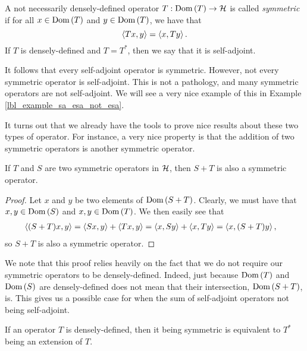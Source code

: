 \begin{definition}
  A not necessarily densely-defined operator $T: \operatorname{Dom}\left(T\right) \to \mathcal{H}$ is called {\emph{symmetric}} if for all $x \in \operatorname{Dom}\left(T\right)$ and $y \in \operatorname{Dom}\left(T\right)$, we have that
  \begin{equation*}
    \left\langle Tx, y\right\rangle = \left\langle x, Ty\right\rangle.
  \end{equation*}
  If $T$ is densely-defined and $T = T^*$, then we say that it is self-adjoint.
\end{definition}

It follows that every self-adjoint operator is symmetric. However, not every symmetric operator is self-adjoint. This is not a pathology, and many symmetric operators are not self-adjoint. We will see a very nice example of this in Example \eqref{lbl_example_sa_esa_not_esa}.

\medskip

It turns out that we already have the tools to prove nice results about these two types of operator. For instance, a very nice property is that the addition of two symmetric operators is another symmetric operator.

\begin{proposition}
  If $T$ and $S$ are two symmetric operators in $\mathcal{H}$, then $S+T$ is also a symmetric operator.
\end{proposition}
\begin{proof}
  Let $x$ and $y$ be two elements of $\operatorname{Dom}\left(S+T\right)$. Clearly, we must have that $x, y \in \operatorname{Dom}\left(S\right)$ and $x, y \in \operatorname{Dom}\left(T\right)$. We then easily see that
  \begin{align*}
    \left\langle (S + T)x, y\right\rangle
    &=
    \left\langle Sx, y\right\rangle + \left\langle Tx, y\right\rangle
    =
    \left\langle x, Sy\right\rangle + \left\langle x, Ty\right\rangle
    =
    \left\langle x, (S + T)y\right\rangle,
  \end{align*}
  so $S+T$ is also a symmetric operator.
\end{proof}
\begin{remark}\label{lbl_remark_failure_of_addition_of_sa_dense_domains}
  We note that this proof relies heavily on the fact that we do not require our symmetric operators to be densely-defined. Indeed, just because $\operatorname{Dom}\left(T\right)$ and $\operatorname{Dom}\left(S\right)$ are densely-defined does not mean that their intersection, $\operatorname{Dom}\left(S+T\right)$, is. This gives us a possible case for when the sum of self-adjoint operators not being self-adjoint.
\end{remark}

If an operator $T$ is densely-defined, then it being symmetric is equivalent to $T^*$ being an extension of $T$.

